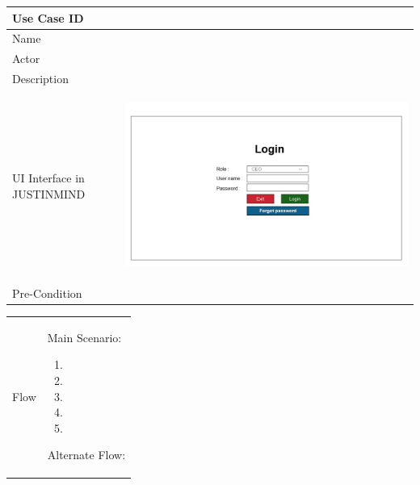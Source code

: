 \documentclass[12pt,a4paper]{report}
\begin{document}
\begin{tabular}{ | m{3cm} | m{12cm}| } \hline

Use Case ID &   \\\hline

Name  	    &   \\ \hline

Actor     	&  \\ \hline

Description &  \\ \hline

UI Interface in JUSTINMIND & \begin{center} \includegraphics[scale=0.3]{./UIs for Latex Reports/UI-002 Login@1x.png}\end{center}  \\ \hline

Pre-Condition &   \\ \hline

\end{tabular} \newpage \begin{tabular}{ | m{3cm} | m{12cm}| }  \hline
Flow & Main Scenario:

\begin{enumerate}
\item   
\item	
\item	
\item	
\item
\end{enumerate}

Alternate Flow:


\end{tabular}
\end{document}
